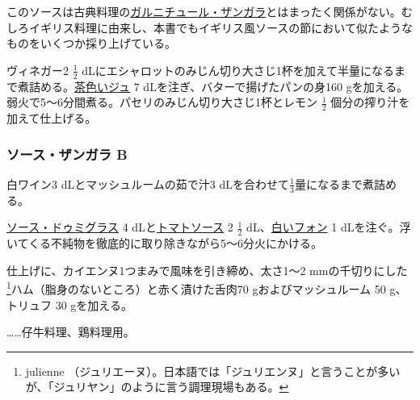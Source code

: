 \begin{recette}

 

このソースは古典料理の\protect\hyperlink{garniture-zingara}{ガルニチュール・ザンガラ}とはまったく関係がない。むしろイギリス料理に由来し、本書でもイギリス風ソースの節において似たようなものをいくつか採り上げている。

ヴィネガー2 \(\frac{1}{2}\)
dLにエシャロットのみじん切り大さじ1杯を加えて半量になるまで煮詰める。\protect\hyperlink{jus-de-veau-lie}{茶色いジュ}
7 dLを注ぎ、バターで揚げたパンの身160
gを加える。弱火で5〜6分間煮る。パセリのみじん切り大さじ1杯とレモン
\(\frac{1}{2}\) 個分の搾り汁を加えて仕上げる。

\atoaki{}

\hypertarget{sauce-zingara-b}{%
\subsubsection{ソース・ザンガラ B}\label{sauce-zingara-b}}


 

白ワイン3 dLとマッシュルームの茹で汁3
dLを合わせて\(\frac{1}{3}\)量になるまで煮詰める。

\protect\hyperlink{sauce-demi-glace}{ソース・ドゥミグラス} 4
dLと\protect\hyperlink{sauce-tomate}{トマトソース} 2 \(\frac{1}{2}\)
dL、\protect\hyperlink{fonds-blanc}{白いフォン} 1
dLを注ぐ。浮いてくる不純物を徹底的に取り除きながら5〜6分火にかける。

仕上げに、カイエンヌ1つまみで風味を引き締め、太さ1〜2 mmの千切りにした
\footnote{julienne
  （ジュリエーヌ）。日本語では「ジュリエンヌ」と言うことが多いが、「ジュリヤン」のように言う調理現場もある。}ハム（脂身のないところ）と赤く漬けた舌肉70
gおよびマッシュルーム 50 g、トリュフ 30 gを加える。

\ldots{}\ldots{}仔牛料理、鶏料理用。


\end{recette}
